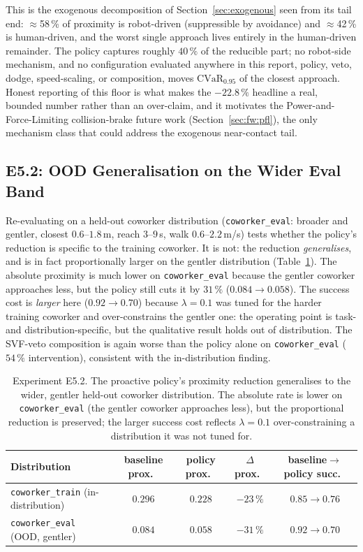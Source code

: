 \documentclass[11pt,a4paper]{report}
\newcommand{\cvar}{\ensuremath{\mathrm{CVaR}}}
\begin{document}
This is the exogenous decomposition of
Section~\ref{sec:exogenous} seen from its tail end:
$\approx$58\,\% of proximity is robot-driven (suppressible by
avoidance) and $\approx$42\,\% is human-driven, and the worst single
approach lives entirely in the human-driven remainder. The policy
captures roughly $40\,\%$ of the reducible part; no robot-side
mechanism, and no configuration evaluated anywhere in this report,
policy, veto, dodge, speed-scaling, or composition, moves
$\cvar_{0.95}$ of the closest approach. Honest reporting of this
floor is what makes the $-22.8\,\%$ headline a real, bounded number
rather than an over-claim, and it motivates the
Power-and-Force-Limiting collision-brake future work
(Section~\ref{sec:fw:pfl}), the only mechanism class that could
address the exogenous near-contact tail.

\subsection{E5.2: OOD Generalisation on the Wider Eval Band}
\label{sec:results:ood}

Re-evaluating on a held-out coworker distribution
(\texttt{coworker\_eval}: broader and gentler, closest $0.6$--$1.8$\,m,
reach $3$--$9$\,s, walk $0.6$--$2.2$\,m/s) tests whether the policy's
reduction is specific to the training coworker. It is not: the
reduction \emph{generalises}, and is in fact proportionally larger on
the gentler distribution (Table~\ref{tab:e5.2-ood}). The absolute
proximity is much lower on \texttt{coworker\_eval} because the gentler
coworker approaches less, but the policy still cuts it by $31\,\%$
($0.084 \rightarrow 0.058$). The success cost is \emph{larger} here
($0.92 \rightarrow 0.70$) because $\lambda = 0.1$ was tuned for the
harder training coworker and over-constrains the gentler one: the
operating point is task- and distribution-specific, but the
qualitative result holds out of distribution. The SVF-veto
composition is again worse than the policy alone on
\texttt{coworker\_eval} ($54\,\%$ intervention), consistent with the
in-distribution finding.

\begin{table}[htbp]
\centering
\caption{Experiment E5.2. The proactive policy's proximity reduction
generalises to the wider, gentler held-out coworker distribution. The
absolute rate is lower on \texttt{coworker\_eval} (the gentler
coworker approaches less), but the proportional reduction is
preserved; the larger success cost reflects $\lambda = 0.1$
over-constraining a distribution it was not tuned for.}
\label{tab:e5.2-ood}
\small
\begin{tabular}{lcccc}
\toprule
Distribution & baseline prox.\ & policy prox.\ & $\Delta$ prox.\ & baseline$\to$policy succ.\ \\
\midrule
\texttt{coworker\_train} (in-distribution) & $0.296$ & $0.228$ & $-23\,\%$ & $0.85 \to 0.76$ \\
\texttt{coworker\_eval} (OOD, gentler)     & $0.084$ & $0.058$ & $-31\,\%$ & $0.92 \to 0.70$ \\
\bottomrule
\end{tabular}
\end{table}
\end{document}

